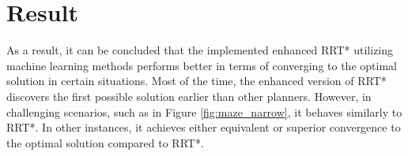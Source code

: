 \documentclass{ctuthesis}
\begin{document}
\section{Result}
As a result, 
it can be concluded that the implemented enhanced RRT* utilizing machine learning methods 
performs better in terms of converging to the optimal solution in certain situations. 
Most of the time, the enhanced version of RRT* discovers the first possible solution earlier 
than other planners. 
However, in challenging scenarios, such as in Figure \ref{fig:maze_narrow}, 
it behaves similarly to RRT*. 
In other instances, 
it achieves either equivalent or superior convergence to the optimal solution compared to RRT*.
\end{document}
